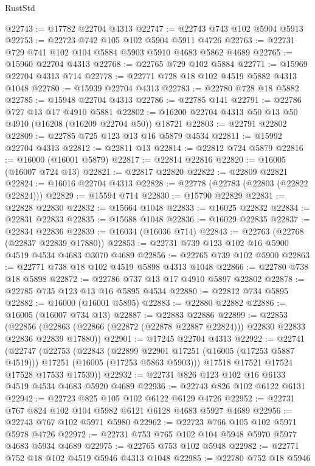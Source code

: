 \begin{lexlean}{RustStd}
\begin{coremodule}
@22743 := @17782 @22704 @4313
@22747 := @22743 @743 @102 @5904 @5913
@22753 := @22723 @742 @105 @102 @5904 @5911 @4726
@22763 := @22731 @729 @741 @102 @104 @5884 @5903 @5910 @4683 @5862 @4689
@22765 := @15960 @22704 @4313
@22768 := @22765 @729 @102 @5884
@22771 := @15969 @22704 @4313 @714
@22778 := @22771 @728 @18 @102 @4519 @5882 @4313 @1048
@22780 := @15939 @22704 @4313
@22783 := @22780 @728 @18 @5882
@22785 := @15948 @22704 @4313
@22786 := @22785 @141
@22791 := @22786 @727 @13 @17 @4910 @5881
@22802 := @16200 @22704 @4313 @50 @13 @50 @4910 (@16208 (@16209 @22704 @50)) @18721
@22803 := @22791 @22802
@22809 := @22785 @725 @123 @13 @16 @5879 @4534
@22811 := @15992 @22704 @4313
@22812 := @22811 @13
@22814 := @22812 @724 @5879
@22816 := @16000 (@16001 @5879)
@22817 := @22814 @22816
@22820 := @16005 (@16007 @724 @13)
@22821 := @22817 @22820
@22822 := @22809 @22821
@22824 := @16016 @22704 @4313
@22828 := @22778 (@22783 (@22803 (@22822 @22824)))
@22829 := @15594 @714
@22830 := @15790 @22829
@22831 := @22828 @22830
@22832 := @15664 @1048
@22833 := @16025 @22832
@22834 := @22831 @22833
@22835 := @15688 @1048
@22836 := @16029 @22835
@22837 := @22834 @22836
@22839 := @16034 (@16036 @714)
@22843 := @22763 (@22768 (@22837 @22839 @17880))
@22853 := @22731 @739 @123 @102 @16 @5900 @4519 @4534 @4683 @3070 @4689
@22856 := @22765 @739 @102 @5900
@22863 := @22771 @738 @18 @102 @4519 @5898 @4313 @1048
@22866 := @22780 @738 @18 @5898
@22872 := @22786 @737 @13 @17 @4910 @5897 @22802
@22878 := @22785 @735 @123 @13 @16 @5895 @4534
@22880 := @22812 @734 @5895
@22882 := @16000 (@16001 @5895)
@22883 := @22880 @22882
@22886 := @16005 (@16007 @734 @13)
@22887 := @22883 @22886
@22899 := @22853
    (@22856 (@22863 (@22866 (@22872 (@22878 @22887 @22824))) @22830 @22833 @22836 @22839 @17880))
@22901 := @17245 @22704 @4313
@22922 := @22741
    (@22747
      (@22753
        (@22843
          (@22899 @22901 @17251 (@16005 (@17253 @5887 @4519)))
          @17251
          (@16005 (@17253 @5863 @5903)))
        @17518
        @17521
        @17524
        @17528
        @17533
        @17539))
@22932 := @22731 @826 @123 @102 @16 @6133 @4519 @4534 @4683 @5920 @4689
@22936 := @22743 @826 @102 @6122 @6131
@22942 := @22723 @825 @105 @102 @6122 @6129 @4726
@22952 := @22731 @767 @824 @102 @104 @5982 @6121 @6128 @4683 @5927 @4689
@22956 := @22743 @767 @102 @5971 @5980
@22962 := @22723 @766 @105 @102 @5971 @5978 @4726
@22972 := @22731 @753 @765 @102 @104 @5948 @5970 @5977 @4683 @5934 @4689
@22975 := @22765 @753 @102 @5948
@22982 := @22771 @752 @18 @102 @4519 @5946 @4313 @1048
@22985 := @22780 @752 @18 @5946

\end{coremodule}
\end{lexlean}

